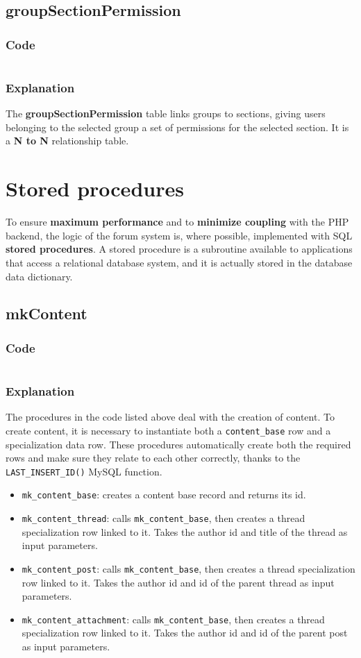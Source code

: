 \documentclass[12pt]{report}
\renewcommand\emph{\textbf}
\newcommand{\printSQLtest}[1]
{
    \inputminted[linenos, breaklines, breakbytoken, tabsize=4, fontsize=\footnotesize]{mysql}{#1}
}
\newcommand{\printSQLTablepage}[2]
{    
    \subsection{#2}
    \subsubsection{Code}
    \printSQLtest{../sql/parts/#1}
    \subsubsection{Explanation}
}
\begin{document}
                \newpage

                \printSQLTablepage{20_tblGroupSectionPermission.sql}{groupSectionPermission}
                    The \emph{groupSectionPermission} table links groups to sections, giving users belonging to the selected group a set of permissions for the selected section.
                    It is a \emph{N to N} relationship table.

                \newpage

            \section{Stored procedures}

                To ensure \emph{maximum performance} and to \emph{minimize coupling} with the PHP backend, the logic of the forum system is, where possible, implemented with SQL \emph{stored procedures}.
                A stored procedure is a subroutine available to applications that access a relational database system, and it is actually stored in the database data dictionary.

                \printSQLTablepage{21_procsMkContent.sql}{mkContent}
                    The procedures in the code listed above deal with the creation of content. To create content, it is necessary to instantiate both a \texttt{content_base} row and a specialization data row.
                    These procedures automatically create both the required rows and make sure they relate to each other correctly, thanks to the \texttt{LAST_INSERT_ID()} MySQL function.

                    \begin{itemize}
                        \item \texttt{mk_content_base}: creates a content base record and returns its id.
                        \item \texttt{mk_content_thread}: calls \texttt{mk_content_base}, then creates a thread specialization row linked to it.
                        Takes the author id and title of the thread as input parameters.
                        \item \texttt{mk_content_post}: calls \texttt{mk_content_base}, then creates a thread specialization row linked to it.
                        Takes the author id and id of the parent thread as input parameters.
                        \item \texttt{mk_content_attachment}: calls \texttt{mk_content_base}, then creates a thread specialization row linked to it.
                        Takes the author id and id of the parent post as input parameters.
                    \end{itemize}
\end{document}

